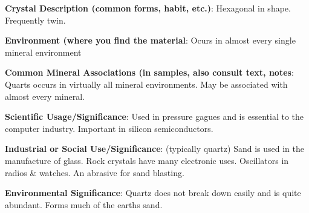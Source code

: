 \documentclass[10pt]{article}
\begin{document}
\begin{framed}
  \textbf{Crystal Description (common forms, habit, etc.)}: Hexagonal in shape. Frequently twin.
\end{framed}

\begin{framed}
  \textbf{Environment (where you find the material}: Ocurs in almost every single mineral environment
\end{framed}

\begin{framed}
  \textbf{Common Mineral Associations (in samples, also consult text, notes}: Quarts occurs in virtually all mineral environments. May be associated with almost every mineral.
\end{framed}

\begin{framed}
  \textbf{Scientific Usage/Significance}: Used in pressure gagues and is essential to the computer industry. Important in silicon semiconductors.
\end{framed}

\begin{framed}
  \textbf{Industrial or Social Use/Significance}: (typically quartz) Sand is used in the manufacture of glass. Rock crystals have many electronic uses. Oscillators in radios \& watches. An abrasive for sand blasting.
\end{framed}

\begin{framed}
  \textbf{Environmental Significance}: Quartz does not break down easily and is quite abundant. Forms much of the earths sand.
\end{framed}

\end{document}

